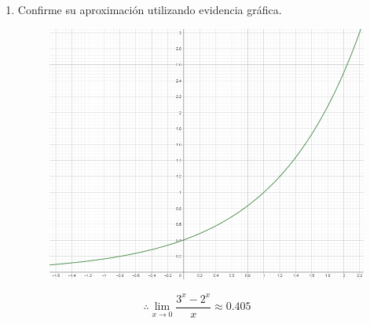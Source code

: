 \documentclass[12pt]{article}
\begin{document}
\begin{enumerate}[label=(\alph*)]
\item Confirme su aproximación utilizando evidencia gráfica.
\begin{figure}[h!]
\centering
\includegraphics[width=1\textwidth]{../img/img_Lista2/ej3.png}
\end{figure}
\end{enumerate}
\[
\therefore \lim_{x \to 0}\frac{3^x-2^x}{x} \approx 0.405
\]
\end{document}
